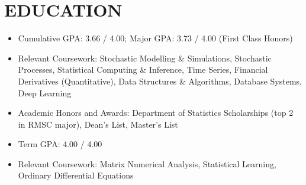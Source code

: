 \documentclass[cmu]{resume}
\begin{document}
    \address{160 Water Street, New York, NY 10038}
    \maketitle
    \section{EDUCATION}

    \begin{itemize}
        \item Cumulative GPA: 3.66 / 4.00; Major GPA: 3.73 / 4.00 (First Class Honors)
        \item Relevant Coursework: Stochastic Modelling \& Simulations, Stochastic Processes, Statistical Computing \& Inference, Time Series, Financial Derivatives (Quantitative), Data Structures \& Algorithms, Database Systems, Deep Learning
        \item Academic Honors and Awards: Department of Statistics Scholarships (top 2 in RMSC major), Dean's List, Master's List
    \end{itemize}

    \begin{itemize}
        \item Term GPA: 4.00 / 4.00
        \item Relevant Coursework: Matrix Numerical Analysis, Statistical Learning, Ordinary Differential Equations
    \end{itemize}

\end{document}
